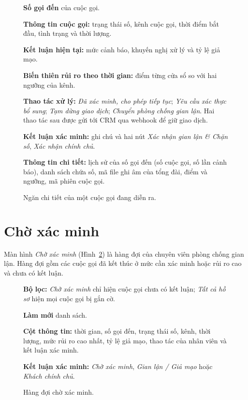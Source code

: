 \documentclass[11pt]{article}
\begin{document}
\begin{figure}[tbp]
  \centering
  \caption{Ngăn chi tiết của một cuộc gọi đang diễn ra.}
  \label{fig:drawerlive}
  \begin{flushleft}\small
\begin{legend}
  \item \textbf{Số gọi đến} của cuộc gọi.
  \item \textbf{Thông tin cuộc gọi:} trạng thái số, kênh cuộc gọi, thời điểm bắt đầu, tình trạng và thời lượng.
  \item \textbf{Kết luận hiện tại:} mức cảnh báo, khuyến nghị xử lý và tỷ lệ giả mạo.
  \item \textbf{Biến thiên rủi ro theo thời gian:} điểm từng cửa sổ so với hai ngưỡng của kênh.
  \item \textbf{Thao tác xử lý:} \emph{Đã xác minh, cho phép tiếp tục}; \emph{Yêu cầu xác thực bổ sung}; \emph{Tạm dừng giao dịch}; \emph{Chuyển phòng chống gian lận}. Hai thao tác sau được gửi tới CRM qua webhook để giữ giao dịch.
  \item \textbf{Kết luận xác minh:} ghi chú và hai nút \emph{Xác nhận gian lận \& Chặn số}, \emph{Xác nhận chính chủ}.
  \item \textbf{Thông tin chi tiết:} lịch sử của số gọi đến (số cuộc gọi, số lần cảnh báo), danh sách chứa số, mã file ghi âm của tổng đài, điểm và ngưỡng, mã phiên cuộc gọi.
\end{legend}
  \end{flushleft}
\end{figure}

\section{Chờ xác minh}

Màn hình \emph{Chờ xác minh} (Hình~\ref{fig:review}) là hàng đợi của chuyên viên phòng chống gian lận. Hàng đợi gồm các cuộc gọi đã kết thúc ở mức cần xác minh hoặc rủi ro cao và chưa có kết luận.

\begin{figure}[tbp]
  \centering
  \caption{Hàng đợi chờ xác minh.}
  \label{fig:review}
  \begin{flushleft}\small
\begin{legend}
  \item \textbf{Bộ lọc:} \emph{Chờ xác minh} chỉ hiện cuộc gọi chưa có kết luận; \emph{Tất cả hồ sơ} hiện mọi cuộc gọi bị gắn cờ.
  \item \textbf{Làm mới} danh sách.
  \item \textbf{Cột thông tin:} thời gian, số gọi đến, trạng thái số, kênh, thời lượng, mức rủi ro cao nhất, tỷ lệ giả mạo, thao tác của nhân viên và kết luận xác minh.
  \item \textbf{Kết luận xác minh:} \emph{Chờ xác minh}, \emph{Gian lận / Giả mạo} hoặc \emph{Khách chính chủ}.
\end{legend}
  \end{flushleft}
\end{figure}
\end{document}

